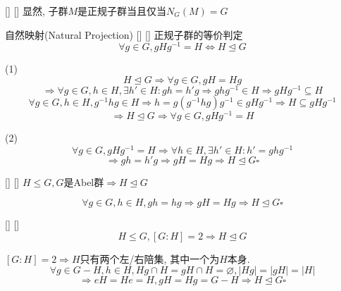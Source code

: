 \documentclass[UTF8]{ctexart}
\begin{document}
        \begin{ppt}
            []
            {}
            []
            []
                显然, 子群$M$是正规子群当且仅当$N_G(M)=G$
       \end{ppt}
		
		\begin{ppt}
            []
            {自然映射(Natural Projection)}
            []
            []
			正规子群的等价判定
			\[\forall g\in G, gHg^{-1}=H\iff H\trianglelefteq G\]
		\end{ppt}
		
		\begin{prf}
		
			(1)\[H\trianglelefteq G\Longrightarrow \forall g\in G, gH=Hg\]
			\[\Longrightarrow \forall g\in G, h\in H, \exists h'\in H: gh=h'g\Longrightarrow ghg^{-1}\in H\Longrightarrow gHg^{-1}\subseteq H\]
			\[\forall g\in G, h\in H, g^{-1}hg\in H\Longrightarrow h=g(g^{-1}hg)g^{-1}\in gHg^{-1}\Longrightarrow H\subseteq gHg^{-1}\]
			\[\Longrightarrow H\trianglelefteq G\Longrightarrow \forall g\in G, gHg^{-1}=H\]
			
			(2)\[\forall g\in G, gHg^{-1}=H\Longrightarrow \forall h\in H, \exists h'\in H: h'=ghg^{-1}\]
			\[\Longrightarrow gh=h'g\Longrightarrow gH=Hg\Longrightarrow H\trianglelefteq G\square\]
		\end{prf}
  
		\begin{ppt}
            []
            {}
            []
            []
			$H\leq G, G$是Abel群$\Longrightarrow H\trianglelefteq G$
		\end{ppt}
		
		\begin{prf}
			\[\forall g\in G, h\in H, gh=hg\Longrightarrow gH=Hg\Longrightarrow H\trianglelefteq G\square\]
		\end{prf}
  
		\begin{ppt}
            []
            {}
            []
            []
			\[H\leq G, [G:H]=2\Longrightarrow H\trianglelefteq G\]
		\end{ppt}
		
		\begin{prf}
			
			$[G:H]=2\Longrightarrow H$只有两个左/右陪集, 其中一个为$H$本身. 
			\[\forall g\in G-H, h\in H, Hg\cap H=gH\cap H=\varnothing,|Hg|=|gH|=|H|\]
			\[\Longrightarrow eH=He=H, gH=Hg=G-H\Longrightarrow H\trianglelefteq G\square\]
		\end{prf}
  
\end{document}
